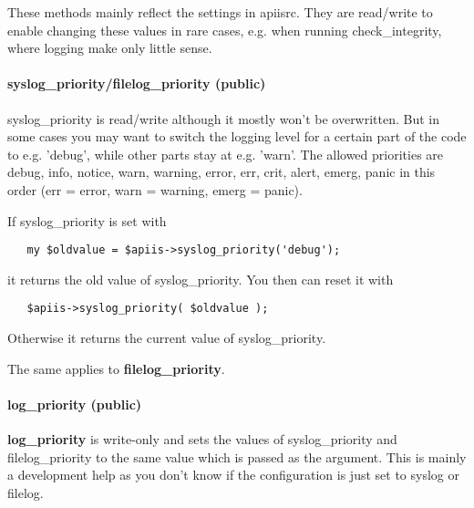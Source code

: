 These methods mainly reflect the settings in apiisrc. They are read/write to
enable changing these values in rare cases, e.g. when running check\_integrity,
where logging make only little sense.

\paragraph*{syslog\_priority/filelog\_priority (public)\label{Apiis::Init_--_Basic_initialisation_object_for_the_complete_APIIS_structure_syslog_priority_filelog_priority_public_}}


syslog\_priority is read/write although it mostly won't be overwritten. But
in some cases you may want to switch the logging level for a certain part
of the code to e.g. 'debug', while other parts stay at e.g. 'warn'.
The allowed priorities are debug, info, notice, warn, warning, error, err, crit,
alert, emerg, panic in this order (err = error, warn = warning, emerg =
panic).



If syslog\_priority is set with

\begin{verbatim}
   my $oldvalue = $apiis->syslog_priority('debug');
\end{verbatim}


it returns the old value of syslog\_priority. You then can reset it with

\begin{verbatim}
   $apiis->syslog_priority( $oldvalue );
\end{verbatim}


Otherwise it returns the current value of syslog\_priority.



The same applies to \textbf{filelog\_priority}.

\paragraph*{log\_priority (public)\label{Apiis::Init_--_Basic_initialisation_object_for_the_complete_APIIS_structure_log_priority_public_}}


\textbf{log\_priority} is write-only and sets the values of syslog\_priority and
filelog\_priority to the same value which is passed as the argument. This is
mainly a development help as you don't know if the configuration is just set
to syslog or filelog.

